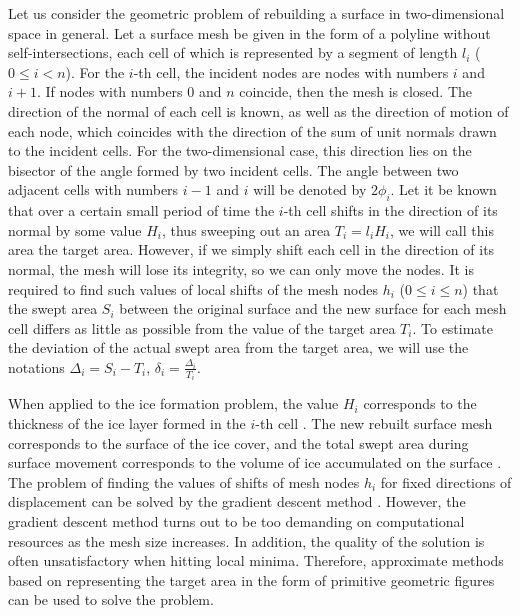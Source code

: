 \documentclass[
11pt,%
tightenlines,%
twoside,%
onecolumn,%
nofloats,%
nobibnotes,%
nofootinbib,%
superscriptaddress,%
noshowpacs,%
centertags]%
{revtex4}
\begin{document}
Let us consider the geometric problem of rebuilding a surface in two-dimensional space in general.
Let a surface mesh be given in the form of a polyline without self-intersections, each cell of which is represented by a segment of length $l_i$ ($0 \le i < n$).
For the $i$-th cell, the incident nodes are nodes with numbers $i$ and $i + 1$.
If nodes with numbers $0$ and $n$ coincide, then the mesh is closed.
The direction of the normal of each cell is known, as well as the direction of motion of each node, which coincides with the direction of the sum of unit normals drawn to the incident cells.
For the two-dimensional case, this direction lies on the bisector of the angle formed by two incident cells.
The angle between two adjacent cells with numbers $i - 1$ and $i$ will be denoted by $2 \phi_i$.
Let it be known that over a certain small period of time the $i$-th cell shifts in the direction of its normal by some value $H_i$, thus sweeping out an area $T_i = l_i H_i$, we will call this area the target area.
However, if we simply shift each cell in the direction of its normal, the mesh will lose its integrity, so we can only move the nodes.
It is required to find such values of local shifts of the mesh nodes $h_i$ ($0 \le i \le n$) that the swept area $S_i$ between the original surface and the new surface for each mesh cell differs as little as possible from the value of the target area $T_i$.
To estimate the deviation of the actual swept area from the target area, we will use the notations $\Delta_i = S_i - T_i$, $\delta_i = \frac{\Delta_i}{T_i}$.

When applied to the ice formation problem, the value $H_i$ corresponds to the thickness of the ice layer formed in the $i$-th cell \cite{Beaugendre}.
The new rebuilt surface mesh corresponds to the surface of the ice cover, and the total swept area during surface movement corresponds to the volume of ice accumulated on the surface \cite{Tong}.
The problem of finding the values of shifts of mesh nodes $h_i$ for fixed directions of displacement can be solved by the gradient descent method \cite{Rybakov}.
However, the gradient descent method turns out to be too demanding on computational resources as the mesh size increases.
In addition, the quality of the solution is often unsatisfactory when hitting local minima.
Therefore, approximate methods based on representing the target area in the form of primitive geometric figures can be used to solve the problem.

\end{document}
